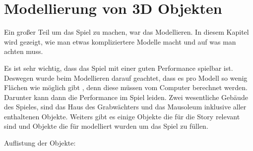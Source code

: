 \section{Modellierung von 3D Objekten}
\label{sec:Modellierung_von_3D_Objekten}
Ein großer Teil um das Spiel zu machen, war das Modellieren. In diesem Kapitel wird gezeigt, wie man etwas kompliziertere
Modelle macht und auf was man achten muss.

Es ist sehr wichtig, dass das Spiel mit einer guten Performance spielbar ist. Deswegen wurde beim Modellieren darauf geachtet,
dass es pro Modell so wenig Flächen wie möglich gibt \citep{unreal:modellierungVon3dObjekten_performance}, denn diese müssen vom Computer berechnet werden.
Darunter kann dann die Performance im Spiel leiden.
Zwei wesentliche Gebäude des Spieles, sind das Haus des Grabwächters und das Mausoleum inklusive aller enthaltenen Objekte.
Weiters gibt es einige Objekte die für die Story relevant sind und Objekte die für modelliert wurden um das Spiel zu füllen.

Auflistung der Objekte:


